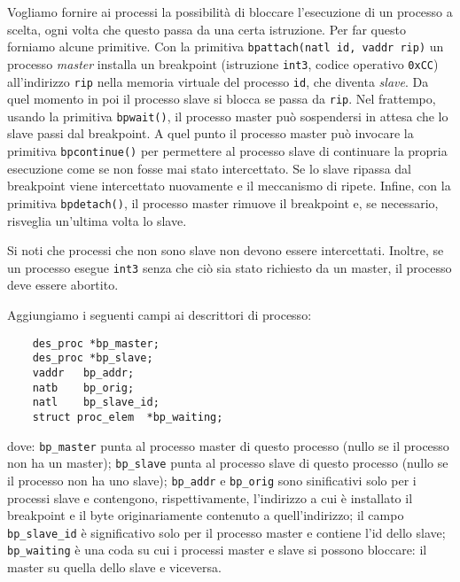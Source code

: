 Vogliamo fornire ai processi la possibilit\`a di bloccare l'esecuzione di un processo a scelta, ogni volta che questo passa da una certa istruzione.
Per far questo forniamo alcune primitive. Con la primitiva \verb|bpattach(natl id, vaddr rip)| un processo {\em master} 
installa un breakpoint (istruzione \verb|int3|, codice operativo \verb|0xCC|) 
all'indirizzo \verb|rip| nella memoria virtuale del processo \verb|id|, che diventa {\em slave}. Da quel momento in poi il processo slave si blocca se passa da \verb|rip|.
Nel frattempo, usando la primitiva \verb|bpwait()|, il processo master
pu\`o sospendersi in attesa che lo slave passi dal breakpoint.
A quel punto il processo master pu\`o invocare la primitiva \verb|bpcontinue()| per permettere al processo
slave di continuare la propria esecuzione come se non fosse mai stato intercettato. Se lo slave ripassa dal breakpoint
viene intercettato nuovamente e il meccanismo di ripete.
Infine, con la primitiva \verb|bpdetach()|, il processo master rimuove il breakpoint e, se necessario, risveglia un'ultima volta lo slave.

Si noti che  processi che non sono slave non devono essere intercettati. 
Inoltre, se un processo esegue \verb|int3| senza che ci\`o sia stato richiesto da un master, il processo
deve essere abortito.

Aggiungiamo i seguenti campi ai descrittori di processo:
\begin{verbatim}
    des_proc *bp_master;
    des_proc *bp_slave;
    vaddr	bp_addr;
    natb	bp_orig;
    natl	bp_slave_id;
    struct proc_elem  *bp_waiting;
\end{verbatim}
dove: \verb|bp_master| punta al processo master di questo processo (nullo se il
processo non ha un master); \verb|bp_slave| punta al processo slave di
questo processo (nullo se il processo non ha uno slave);
\verb|bp_addr| e \verb|bp_orig| sono sinificativi
solo per i processi slave e contengono, rispettivamente,
l'indirizzo a cui \`e installato il breakpoint e il byte
originariamente contenuto a quell'indirizzo; 
il campo \verb|bp_slave_id| \`e significativo solo per il processo
master e contiene l'id dello slave;
\verb|bp_waiting| \`e una coda su cui i processi master e slave si possono
bloccare: il master su quella dello slave e viceversa.

